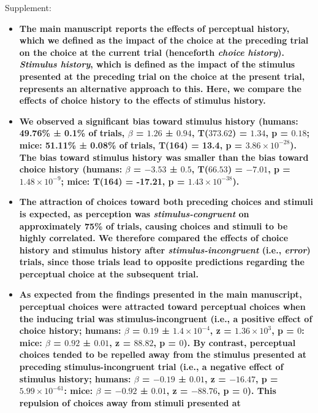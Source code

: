 \documentclass[
]{article}
\begin{document}
Supplement:

\begin{itemize}
\item
  \textbf{The main manuscript reports the effects of perceptual history,
  which we defined as the impact of the choice at the preceding trial on
  the choice at the current trial (henceforth \emph{choice history}).
  \emph{Stimulus history}, which is defined as the impact of the
  stimulus presented at the preceding trial on the choice at the present
  trial, represents an alternative approach to this. Here, we compare
  the effects of choice history to the effects of stimulus history.}
\item
  \textbf{We observed a significant bias toward stimulus history
  (humans: 49.76\% ± 0.1\% of trials, \(\beta\) = \(1.26\) ± \(0.94\),
  T(\(373.62\)) = \(1.34\), p = \(0.18\); mice: 51.11\% ± 0.08\% of
  trials, T(164) = 13.4, p = \(\ensuremath{3.86\times 10^{-28}}\)). The
  bias toward stimulus history was smaller than the bias toward choice
  history (humans: \(\beta\) = \(-3.53\) ± \(0.5\), T(\(66.53\)) =
  \(-7.01\), p = \(\ensuremath{1.48\times 10^{-9}}\); mice: T(164) =
  -17.21, p = \(\ensuremath{1.43\times 10^{-38}}\)).}
\item
  \textbf{The attraction of choices toward both preceding choices and
  stimuli is expected, as perception was \emph{stimulus-congruent} on
  approximately 75\% of trials, causing choices and stimuli to be highly
  correlated. We therefore compared the effects of choice history and
  stimulus history after \emph{stimulus-incongruent} (i.e.,
  \emph{error}) trials, since those trials lead to opposite predictions
  regarding the perceptual choice at the subsequent trial.}
\item
  \textbf{As expected from the findings presented in the main
  manuscript, perceptual choices were attracted toward perceptual
  choices when the inducing trial was stimulus-incongruent (i.e., a
  positive effect of choice history; humans: \(\beta\) = \(0.19\) ±
  \(\ensuremath{1.4\times 10^{-4}}\), z =
  \(\ensuremath{1.36\times 10^{3}}\), p = \(0\): mice: \(\beta\) =
  \(0.92\) ± \(0.01\), z = \(88.82\), p = \(0\)). By contrast,
  perceptual choices tended to be repelled away from the stimulus
  presented at preceding stimulus-incongruent trial (i.e., a negative
  effect of stimulus history; humans: \(\beta\) = \(-0.19\) ± \(0.01\),
  z = \(-16.47\), p = \(\ensuremath{5.99\times 10^{-61}}\): mice:
  \(\beta\) = \(-0.92\) ± \(0.01\), z = \(-88.76\), p = \(0\)). This
  repulsion of choices away from stimuli presented at
}
\end{itemize}
\end{document}
